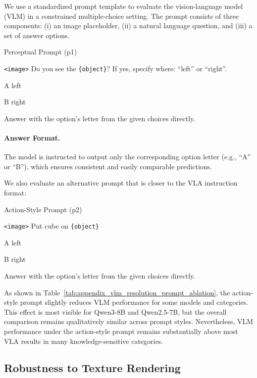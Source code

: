 \documentclass[11pt]{article}
\newcommand{\prompttok}[1]{\textcolor{promptblue}{\texttt{#1}}}
\newcommand{\promptvar}[1]{\textcolor{promptpurple}{\texttt{#1}}}
\begin{document}
We use a standardized prompt template to evaluate the vision-language model (VLM) in a constrained multiple-choice setting. 
The prompt consists of three components: (i) an image placeholder, (ii) a natural language question, and (iii) a set of answer options.

\begin{promptbox}{Perceptual Prompt (p1)}
{\small\ttfamily\raggedright
\prompttok{\textless image\textgreater} Do you see the \promptvar{\{object\}}? If yes, specify where: ``left'' or ``right''.\par
\medskip
A left\par
B right\par
\medskip
Answer with the option's letter from the given choices directly.
}
\end{promptbox}

\paragraph{Answer Format.}
The model is instructed to output only the corresponding option letter (e.g., ``A'' or ``B''), which ensures consistent and easily comparable predictions.

We also evaluate an alternative prompt that is closer to the VLA instruction format:

\begin{promptbox}{Action-Style Prompt (p2)}
{\small\ttfamily\raggedright
\prompttok{\textless image\textgreater} Put cube on \promptvar{\{object\}}\par
\medskip
A left\par
B right\par
\medskip
Answer with the option's letter from the given choices directly.
}
\end{promptbox}

\noindent As shown in Table~\ref{tab:appendix_vlm_resolution_prompt_ablation}, the action-style prompt slightly reduces VLM performance for some models and categories.
This effect is most visible for Qwen3-8B and Qwen2.5-7B, but the overall comparison remains qualitatively similar across prompt styles.
Nevertheless, VLM performance under the action-style prompt remains substantially above most VLA results in many knowledge-sensitive categories.

\subsection{Robustness to Texture Rendering}
\end{document}
